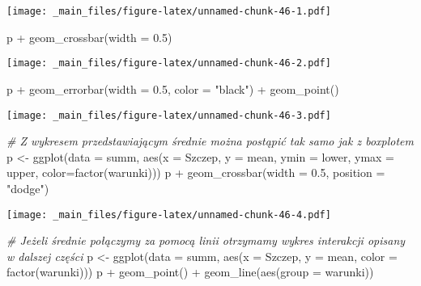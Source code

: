 \documentclass[
]{book}
\newenvironment{Shaded}{\begin{snugshade}}{\end{snugshade}}
\newcommand{\AttributeTok}[1]{\textcolor[rgb]{0.77,0.63,0.00}{#1}}
\newcommand{\CommentTok}[1]{\textcolor[rgb]{0.56,0.35,0.01}{\textit{#1}}}
\newcommand{\FloatTok}[1]{\textcolor[rgb]{0.00,0.00,0.81}{#1}}
\newcommand{\FunctionTok}[1]{\textcolor[rgb]{0.00,0.00,0.00}{#1}}
\newcommand{\NormalTok}[1]{#1}
\newcommand{\OtherTok}[1]{\textcolor[rgb]{0.56,0.35,0.01}{#1}}
\newcommand{\SpecialCharTok}[1]{\textcolor[rgb]{0.00,0.00,0.00}{#1}}
\newcommand{\StringTok}[1]{\textcolor[rgb]{0.31,0.60,0.02}{#1}}
\begin{document}
\texttt{[image: \_main\_files/figure-latex/unnamed-chunk-46-1.pdf]}

\begin{Shaded}
\begin{Highlighting}[]
\NormalTok{p }\SpecialCharTok{+} \FunctionTok{geom\_crossbar}\NormalTok{(}\AttributeTok{width =} \FloatTok{0.5}\NormalTok{)}
\end{Highlighting}
\end{Shaded}

\texttt{[image: \_main\_files/figure-latex/unnamed-chunk-46-2.pdf]}

\begin{Shaded}
\begin{Highlighting}[]
\NormalTok{p }\SpecialCharTok{+} \FunctionTok{geom\_errorbar}\NormalTok{(}\AttributeTok{width =} \FloatTok{0.5}\NormalTok{, }\AttributeTok{color =} \StringTok{"black"}\NormalTok{) }\SpecialCharTok{+} \FunctionTok{geom\_point}\NormalTok{()}
\end{Highlighting}
\end{Shaded}

\texttt{[image: \_main\_files/figure-latex/unnamed-chunk-46-3.pdf]}

\begin{Shaded}
\begin{Highlighting}[]
\CommentTok{\# Z wykresem przedstawiającym średnie można postąpić tak samo jak z boxplotem}
\NormalTok{p }\OtherTok{\textless{}{-}} \FunctionTok{ggplot}\NormalTok{(}\AttributeTok{data =}\NormalTok{ summ, }\FunctionTok{aes}\NormalTok{(}\AttributeTok{x =}\NormalTok{ Szczep, }\AttributeTok{y =}\NormalTok{ mean, }\AttributeTok{ymin =}\NormalTok{ lower, }\AttributeTok{ymax =}\NormalTok{ upper, }
                             \AttributeTok{color=}\FunctionTok{factor}\NormalTok{(warunki)))}
\NormalTok{p }\SpecialCharTok{+} \FunctionTok{geom\_crossbar}\NormalTok{(}\AttributeTok{width =} \FloatTok{0.5}\NormalTok{, }\AttributeTok{position =} \StringTok{"dodge"}\NormalTok{)}
\end{Highlighting}
\end{Shaded}

\texttt{[image: \_main\_files/figure-latex/unnamed-chunk-46-4.pdf]}

\begin{Shaded}
\begin{Highlighting}[]
\CommentTok{\# Jeżeli średnie połączymy za pomocą linii otrzymamy wykres interakcji opisany w dalszej części}
\NormalTok{p }\OtherTok{\textless{}{-}} \FunctionTok{ggplot}\NormalTok{(}\AttributeTok{data =}\NormalTok{ summ, }\FunctionTok{aes}\NormalTok{(}\AttributeTok{x =}\NormalTok{ Szczep, }\AttributeTok{y =}\NormalTok{ mean, }\AttributeTok{color =} \FunctionTok{factor}\NormalTok{(warunki)))}
\NormalTok{p }\SpecialCharTok{+} \FunctionTok{geom\_point}\NormalTok{() }\SpecialCharTok{+} \FunctionTok{geom\_line}\NormalTok{(}\FunctionTok{aes}\NormalTok{(}\AttributeTok{group =}\NormalTok{ warunki))}
\end{Highlighting}
\end{Shaded}
\end{document}
